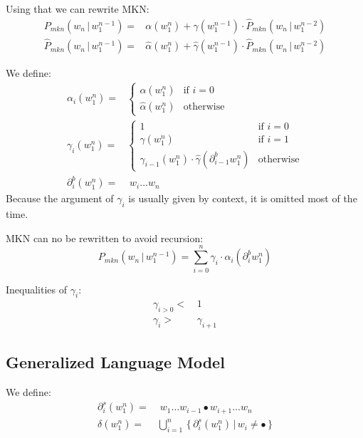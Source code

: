 \documentclass[11pt,a4paper]{article}
\newcommand\givenbase[1][]{\,#1\lvert\,}
\let\given\givenbase
\newcommand{\probSymbol}[1][]{P_{#1}}
\newcommand{\prob}[2][]{\probSymbol[#1](#2)}
\newcommand{\probCond}[3][]{\prob[#1]{#2 \given #3}}
\newcommand{\probSymbolLower}[1][]{\hat{P}_{#1}}
\newcommand{\probLower}[2][]{\probSymbolLower[#1](#2)}
\newcommand{\probCondLower}[3][]{\probLower[#1]{#2 \given #3}}
\begin{document}
Using that we can rewrite MKN:
\begin{align}
  \probCond[mkn]{w_n}{w_1^{n-1}}      =& \alpha(w_1^n) + \gamma(w_1^{n-1}) \cdot \probCondLower[mkn]{w_n}{w_1^{n-2}} \\
  \probCondLower[mkn]{w_n}{w_1^{n-1}} =& \hat\alpha(w_1^n) + \hat\gamma(w_1^{n-1}) \cdot \probCondLower[mkn]{w_n}{w_1^{n-2}}
\end{align}

We define:
\begin{align}
  \alpha_i(w_1^n) =&
    \begin{cases}
      \alpha(w_1^n)     & \text{if } i = 0 \\
      \hat\alpha(w_1^n) & \text{otherwise}
    \end{cases} \\
  \gamma_i(w_1^n) =&
    \begin{cases}
      1                                                                & \text{if } i = 0 \\
      \gamma(w_1^n)                                                    & \text{if } i = 1 \\
      \gamma_{i-1}(w_1^n) \cdot \hat\gamma(\partial^b_{i-1} w_1^n) & \text{otherwise}
    \end{cases} \\
  \partial^b_i(w_1^n) =& \; w_i \ldots w_n
\end{align}
Because the argument of $\gamma_i$ is usually given by context, it is omitted
most of the time.

MKN can no be rewritten to avoid recursion:
\begin{equation}
  \probCond[mkn]{w_n}{w_1^{n-1}} = \sum_{i=0}^n \gamma_i \cdot \alpha_i(\partial^b_i w_1^n)
\end{equation}

Inequalities of $\gamma_i$:
\begin{align}
  \gamma_{i>0} <& \, 1 \\
  \gamma_i     >& \, \gamma_{i+1}
\end{align}

\subsection{Generalized Language Model}

We define:
\begin{align}
  \partial^s_i(w_1^n) =& \; w_1 \ldots w_{i-1} \bullet w_{i+1} \ldots w_n \\
  \delta(w_1^n)             =& \bigcup_{i = 1}^n \,\{ \, \partial^s_i(w_1^n) \given w_i \neq \bullet \, \}
\end{align}
\end{document}
